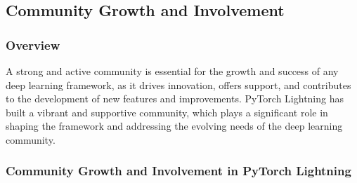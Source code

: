 \documentclass[12pt]{article}
\begin{document}
\subsection{Community Growth and Involvement}

\subsubsection{Overview}

A strong and active community is essential for the growth and success of any deep learning framework, as it drives innovation, offers support, and contributes to the development of new features and improvements. PyTorch Lightning has built a vibrant and supportive community, which plays a significant role in shaping the framework and addressing the evolving needs of the deep learning community.

\subsubsection{Community Growth and Involvement in PyTorch Lightning}
\end{document}
